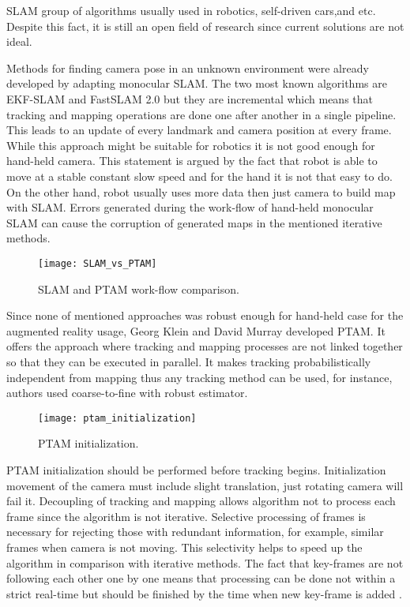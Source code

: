 \documentclass[../../../../main]{subfiles}
\begin{document}
\ac{SLAM} group of algorithms usually used in robotics, self-driven cars,and etc. Despite this fact, it is still an open field of research since current solutions are not ideal.

Methods for finding camera pose in an unknown environment were already developed by adapting monocular \ac{SLAM}. The two most known algorithms are EKF-SLAM and FastSLAM 2.0 \cite{fast_slam} but they are incremental which means that tracking and mapping operations are done one after another in a single pipeline. This leads to an update of every landmark and camera position at every frame. While this approach might be suitable for robotics it is not good enough for hand-held camera. This statement is argued by the fact that robot is able to move at a stable constant slow speed and for the hand it is not that easy to do. On the other hand, robot usually uses more data then just camera to build map with \ac{SLAM}. Errors generated during the work-flow of hand-held monocular \ac{SLAM} can cause the corruption of generated maps in the mentioned iterative methods.

\begin{figure} [ht!]
    \begin{center}
        \texttt{[image: SLAM\_vs\_PTAM]}
        \caption{\ac{SLAM} and \ac{PTAM} work-flow comparison.}
        \label{fig:slam}
    \end{center}
\end{figure}

Since none of mentioned approaches was robust enough for hand-held case for the augmented reality usage, Georg Klein and David Murray developed \ac{PTAM}. It offers the approach where tracking and mapping processes are not linked together so that they can be executed in parallel. It makes tracking probabilistically independent from mapping thus any tracking method can be used, for instance, authors used coarse-to-fine with robust estimator.

\begin{figure} [ht!]
    \begin{center}
        \texttt{[image: ptam\_initialization]}
        \caption{\ac{PTAM} initialization.}
        \label{fig:slam}
    \end{center}
\end{figure}

\ac{PTAM} initialization should be performed before tracking begins. Initialization movement of the camera must include slight translation, just rotating camera will fail it. 
Decoupling of tracking and mapping allows algorithm not to process each frame since the algorithm is not iterative. Selective processing of frames is necessary for rejecting those with redundant information, for example, similar frames when camera is not moving. This selectivity helps to speed up the algorithm in comparison with iterative methods. The fact that key-frames are not following each other one by one means that processing can be done not within a strict real-time but should be finished by the time when new key-frame is added \cite{ptam}.
\end{document}
